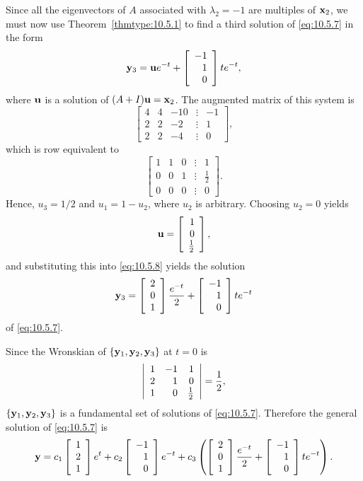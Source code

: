 \begin{examplesolution}
Since all the eigenvectors of $A$ associated with $\lambda_{2}=-1$ are multiples of ${\bf x}_{2}$,
we must now use Theorem~\ref{thmtype:10.5.1} to find a third solution of \eqref{eq:10.5.7} in the
form
\begin{equation}
  \label{eq:10.5.8}{\bf y}_{3}={\bf u}e^{-t}+\left[\begin{array}{r}-1\\1\\0\end{array}\right]te^{-t},
\end{equation}
where ${\bf u}$ is a solution of $(A+I){\bf u}={\bf x}_{2}$. The augmented matrix of this system is
\[
  \left[
  \begin{array}{rrrcr}
    4 & 4 & -10 & \vdots & -1 \\
    2 & 2 & -2  & \vdots & 1  \\
    2 & 2 & -4  & \vdots & 0
  \end{array}\right],
\]
which is row equivalent to
\[
  \left[
  \begin{array}{rrrcr}
    1 & 1 & 0 & \vdots & 1           \\
    0 & 0 & 1 & \vdots & \frac{1}{2} \\
    0 & 0 & 0 & \vdots & 0
  \end{array}\right].
\]
Hence, $u_{3}=1/2$ and $u_{1}=1-u_{2}$, where $u_{2}$ is arbitrary. Choosing $u_{2}=0$ yields
\[
  {\bf u}=\left[\begin{array}{r}1\\0\\\frac{1}{2}\end{array}\right],
\]
and substituting this into \eqref{eq:10.5.8} yields the solution
\[
  {\bf y}_{3}=\left[\begin{array}{r}2\\0\\1\end{array}\right]{\frac{e^{-t}}{2}}+\left[\begin{array}{r}-1\\1\\0\end{array}\right]te^{-t}
\]
of \eqref{eq:10.5.7}.

Since the Wronskian of $\{{\bf y}_{1},{\bf y}_{2},{\bf y}_{3}\}$ at $t=0$ is
\[
  \left|
  \begin{array}{rrr}
    1 & -1 & 1       \\
    2 & 1  & 0       \\
    1 & 0  & 1\over2
  \end{array}\right|=\frac{1}{2},
\]
$\{{\bf y}_{1},{\bf y}_{2},{\bf y}_{3}\}$ is a fundamental set of solutions of \eqref{eq:10.5.7}.
Therefore the general solution of \eqref{eq:10.5.7} is
\[
  {\bf y}=c_{1}\left[\begin{array}{r}1\\2\\1\end{array}\right]e^{t}+c_{2}\left[\begin{array}{r}-1\\1\\0\end{array}\right]e^{-t}+c_{3}\left (\left[\begin{array}{r}2\\0\\1\end{array}\right]{\frac{e^{-t}}{2}}+\left[\begin{array}{r}-1\\1\\0\end{array}\right]te^{-t}\right).
\]
\end{examplesolution}

